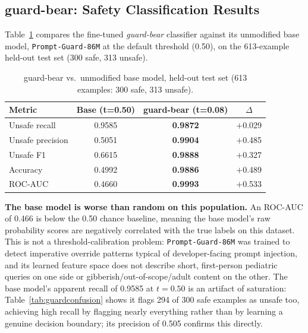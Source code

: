 \documentclass[pdflatex,sn-mathphys-num]{sn-jnl}%
\begin{document}
\subsection{guard-bear: Safety Classification Results}\label{sec:guardresults}

Table~\ref{tab:guardheadline} compares the fine-tuned \textit{guard-bear} classifier against its unmodified base model, \texttt{Prompt-Guard-86M} at the default threshold (0.50), on the 613-example held-out test set (300 safe, 313 unsafe).

\begin{table}[!h]
  \centering
  \caption{guard-bear vs.\ unmodified base model, held-out test set (613 examples: 300 safe, 313 unsafe).}
  \label{tab:guardheadline}
  \small
  \begin{tabular}{@{}lccc@{}}
    \toprule
    Metric & Base (t=0.50) & guard-bear (t=0.08) & $\Delta$ \\
    \midrule
    Unsafe recall    & 0.9585 & \textbf{0.9872} & $+$0.029 \\
    Unsafe precision & 0.5051 & \textbf{0.9904} & $+$0.485 \\
    Unsafe F1        & 0.6615 & \textbf{0.9888} & $+$0.327 \\
    Accuracy         & 0.4992 & \textbf{0.9886} & $+$0.489 \\
    ROC-AUC          & 0.4660 & \textbf{0.9993} & $+$0.533 \\
    \bottomrule
  \end{tabular}
\end{table}

\textbf{The base model is worse than random on this population.} An ROC-AUC of 0.466 is below the 0.50 chance baseline, meaning the base model's raw probability scores are negatively correlated with the true labels on this dataset. This is not a threshold-calibration problem: \texttt{Prompt-Guard-86M} was trained to detect imperative override patterns typical of developer-facing prompt injection, and its learned feature space does not describe short, first-person pediatric queries on one side or gibberish/out-of-scope/adult content on the other. The base model's apparent recall of 0.9585 at $t=0.50$ is an artifact of saturation: Table~\ref{tab:guardconfusion} shows it flags 294 of 300 safe examples as unsafe too, achieving high recall by flagging nearly everything rather than by learning a genuine decision boundary; its precision of 0.505 confirms this directly.
\end{document}
